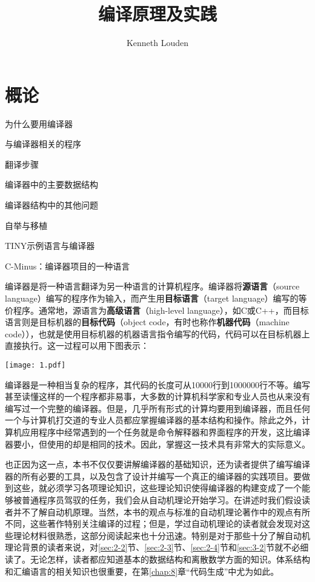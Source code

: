 \documentclass[lang=cn,10pt]{elegantbook}
\title{编译原理及实践}
\author{Kenneth Louden}
\begin{document}
\maketitle
\frontmatter

\tableofcontents

\mainmatter

\chapter{概论}
\label{chap:1}

\begin{introduction}
  \item 为什么要用编译器
  \item 与编译器相关的程序
  \item 翻译步骤
  \item 编译器中的主要数据结构
  \item 编译器结构中的其他问题
  \item 自举与移植
  \item TINY示例语言与编译器
  \item C-Minus：编译器项目的一种语言
\end{introduction}

编译器是将一种语言翻译为另一种语言的计算机程序。编译器将\textbf{源语言}（source language）编写的程序作为输入，而产生用\textbf{目标语言}（target language）编写的等价程序。通常地，源语言为\textbf{高级语言}（high-level language），如C或C++，而目标语言则是目标机器的\textbf{目标代码}（object code，有时也称作\textbf{机器代码}（machine code）），也就是使用目标机器的机器语言指令编写的代码，代码可以在目标机器上直接执行。这一过程可以用下图表示：

\begin{center}
  \texttt{[image: 1.pdf]}
\end{center}

编译器是一种相当复杂的程序，其代码的长度可从10000行到1000000行不等。编写甚至读懂这样的一个程序都非易事，大多数的计算机科学家和专业人员也从来没有编写过一个完整的编译器。但是，几乎所有形式的计算均要用到编译器，而且任何一个与计算机打交道的专业人员都应掌握编译器的基本结构和操作。除此之外，计算机应用程序中经常遇到的一个任务就是命令解释器和界面程序的开发，这比编译器要小，但使用的却是相同的技术。因此，掌握这一技术具有非常大的实际意义。

也正因为这一点，本书不仅仅要讲解编译器的基础知识，还为读者提供了编写编译器的所有必要的工具，以及包含了设计并编写一个真正的编译器的实践项目。要做到这些，就必须学习各项理论知识，这些理论知识使得编译器的构建变成了一个能够被普通程序员驾驭的任务，我们会从自动机理论开始学习。在讲述时我们假设读者并不了解自动机原理。当然，本书的观点与标准的自动机理论著作中的观点有所不同，这些著作特别关注编译的过程；但是，学过自动机理论的读者就会发现对这些理论材料很熟悉，这部分阅读起来也十分迅速。特别是对于那些十分了解自动机理论背景的读者来说，对\ref{sec:2-2}节、\ref{sec:2-3}节、\ref{sec:2-4}节和\ref{sec:3-2}节就不必细读了。无论怎样，读者都应知道基本的数据结构和离散数学方面的知识。体系结构和汇编语言的相关知识也很重要，在第\ref{chap:8}章“代码生成”中尤为如此。
\end{document}

